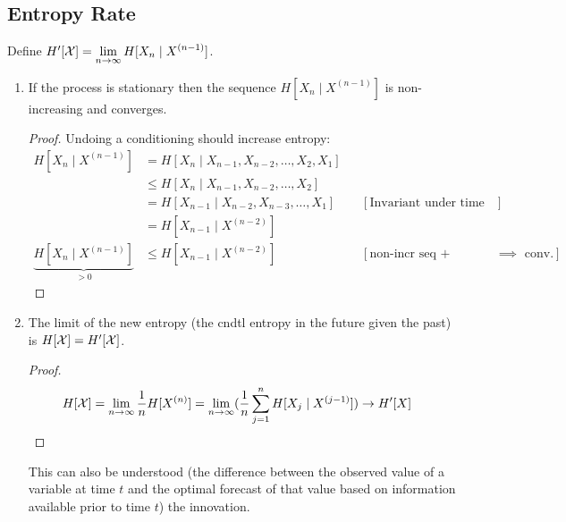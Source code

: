 \subsection{Entropy Rate}





Define $H'[\mathcal{X}]=\displaystyle\lim_{n\to\infty} H[X_n \mid X^{(n-1)}]$.
\begin{enumerate}
    \item If the process is stationary then the sequence $H[X_n\mid X^{(n-1)}]$ is non-increasing and converges.
    \begin{shaded}
        \begin{proof}
        Undoing a conditioning should increase entropy:
            \begin{align*}
                H[X_n\mid X^{(n-1)}] 
                &=
                H[X_n \mid X_{n-1}, X_{n-2},\ldots,X_{2},X_{1}]
                \\
                &\leq H[X_n \mid X_{n-1}, X_{n-2},\ldots,X_{2}]
                \\
                &= H[X_{n-1} \mid X_{n-2}, X_{n-3},\ldots,X_{1}]
                &&[\text{Invariant under time shifts}]
                \\
                &= H[X_{n-1}\mid X^{(n-2)}]
                \\
                \underbrace{H[X_n\mid X^{(n-1)}]}_{>0}
                &\leq H[X_{n-1}\mid X^{(n-2)}]
                &&[\text{non-incr seq + bounded below $\implies$ conv.}]
            \end{align*}
        \end{proof}
    \end{shaded}
    \item The limit of the new entropy (the cndtl entropy in the future given the past) is $H[\mathcal{X}]=H'[\mathcal{X}]$.
    \begin{shaded}
        \begin{proof}
            \begin{align*}
                H[\mathcal{X}] 
                &=
                \lim_{n\to\infty}\frac1n H[X^{(n)}] 
                = \lim_{n\to\infty} (\frac1n\sum_{j=1}^n H[X_j\mid X^{(j-1)}])
                \to H'[X]
            \end{align*}
        \end{proof}
    This can also be understood (the difference between the observed value of a variable at time $t$ and the optimal forecast of that value based on information available prior to time $t$) the innovation.
    \end{shaded}
\end{enumerate}
